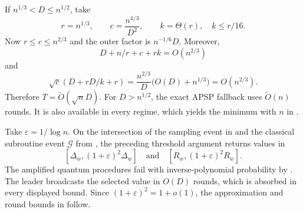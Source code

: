 \documentclass[11pt]{article}
\theoremstyle{definition}
\newcommand{\eps}{\varepsilon}
\newcommand{\diamw}{\Delta_w}
\newcommand{\radw}{R_w}
\newcommand{\wtO}{\widetilde O}
\begin{document}
If $n^{1/3}<D\leq n^{1/2}$, take
\[
  r=n^{1/3},\qquad
  c=\frac{n^{4/3}}{D^2},\qquad
  k=\Theta(r),\quad k\leq r/16.
  \tag{17}\label{eq:medium-D-parameters}
\]
Now $r\leq c\leq n^{2/3}$ and the outer factor is $n^{-1/6}D$.  Moreover,
\[
  D+n/r+c+rk=O(n^{2/3})
\]
and
\[
  \sqrt c\left(D+rD/k+r\right)
  =\frac{n^{2/3}}D\bigl(O(D)+n^{1/3}\bigr)
  =O(n^{2/3}).
\]
Therefore $T=\wtO(\sqrt nD)$.  For $D>n^{1/2}$, the exact APSP fallback uses
$\wtO(n)$ rounds.  It is also available in every regime, which yields the
minimum with $n$ in .

Take $\eps=1/\log n$.  On the intersection of the sampling event in
 and the classical subroutine event $\mathcal G$ from
, the preceding threshold argument returns values in
\[
  [\diamw,(1+\eps)^2\diamw]
  \quad\text{and}\quad
  [\radw,(1+\eps)^2\radw].
\]
The amplified quantum procedures fail with inverse-polynomial probability by
.  The leader broadcasts the selected value in $O(D)$
rounds, which is absorbed in every displayed bound.  Since
$(1+\eps)^2=1+o(1)$, the approximation and round bounds in
 follow.



\end{document}
